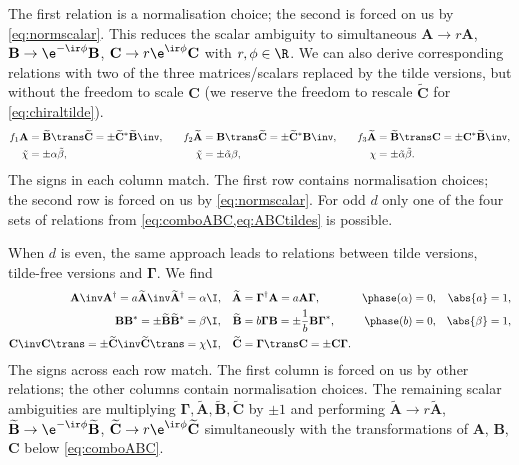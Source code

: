 \documentclass[11pt]{article}
\newcommand{\Gammab}{\boldsymbol{\Gamma}}
\newcommand{\A}{\mathbf{A}}
\newcommand{\B}{\mathbf{B}}
\renewcommand{\C}{\mathbf{C}}
\newcommand{\At}{\widetilde{\mathbf{A}}}
\newcommand{\Bt}{\widetilde{\mathbf{B}}}
\newcommand{\Ct}{\widetilde{\mathbf{C}}}
\newcommand{\alphat}{\tilde{\alpha}}
\newcommand{\betat}{\tilde{\beta}}
\newcommand{\chit}{\tilde{\chi}}
\begin{document}
%
The first relation is a normalisation choice; the second is forced on us by \cref{eq:normscalar}.
This reduces the scalar ambiguity to simultaneous \( \A \rightarrow r \A \),
\( \B \rightarrow \e^{-\ir\phi} \B \), \( \C \rightarrow r\e^{\ir\phi} \C \)
with \( r, \phi \in \R \).
We can also derive corresponding relations with two of the three matrices/scalars replaced by the tilde versions, but without the freedom to scale $\C$ (we reserve the freedom to rescale $\Ct$ for \cref{eq:chiraltilde}).
%
\begin{equation}\label{eq:ABCtildes}
\begin{aligned}
  f_1 \A &= \Bt\trans \Ct = \pm \Ct^\ast \Bt\inv, &\quad
  f_2 \At &= \B\trans \Ct = \pm \Ct^\ast \B\inv, &\quad
  f_3 \At &= \Bt\trans \C = \pm \C^\ast \Bt\inv, \\
  {\chit} &= \pm {\alpha} {\betat}, &
  {\chit} &= \pm {\alphat} {\beta}, &
  {\chi} &= \pm {\alphat} {\betat}.
\end{aligned}
\end{equation}
%
The signs in each column match.
The first row contains normalisation choices; the second row is forced on us by \cref{eq:normscalar}.
For odd $d$ only one of the four sets of relations from \cref{eq:comboABC,eq:ABCtildes} is possible.

When $d$ is even, the same approach leads to relations between tilde versions, tilde-free versions and $\Gammab$.
We find
%
\begin{equation}\label{eq:chiraltilde}
\begin{aligned}
  \A\inv \A^\dag = a \At\inv \At^\dag &= \alpha \I,    &
  \At &= \Gammab^\dag \A = a \A \Gammab, &
  \phase(\alpha) &= 0, &
  \abs{a} &= 1, \\
  \B \B^\ast = \pm \Bt \Bt^\ast &= \beta \I, &
  \Bt &= b \Gammab \B = \pm \frac{1}{b} \B \Gammab^\ast,  &
  \phase(b) &= 0, &
  \abs{\beta} &= 1, \\
  \C\inv \C\trans = \pm \Ct\inv \Ct\trans &= \chi \I,    &
  \Ct &= \Gammab\trans \C = \pm \C \Gammab. &
\end{aligned}
\end{equation}
%
The signs across each row match.
The first column is forced on us by other relations; the other columns contain normalisation choices.
The remaining scalar ambiguities are multiplying $\Gammab,\At,\Bt,\Ct$ by $\pm1$
and performing \( \At \rightarrow r \At \), \( \Bt \rightarrow \e^{-\ir\phi} \Bt \),
\( \Ct \rightarrow r\e^{\ir\phi} \Ct \) simultaneously with the transformations of $\A$, $\B$, $\C$ below \cref{eq:comboABC}.
\end{document}
